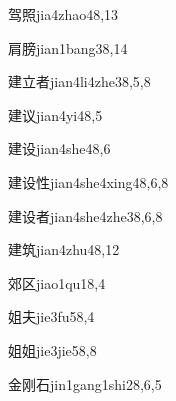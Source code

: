 \begin{verbete}{驾照}{jia4zhao4}{8,13}
\end{verbete}

\begin{verbete}{肩膀}{jian1bang3}{8,14}
\end{verbete}

\begin{verbete}{建立者}{jian4li4zhe3}{8,5,8}
\end{verbete}

\begin{verbete}{建议}{jian4yi4}{8,5}
\end{verbete}

\begin{verbete}{建设}{jian4she4}{8,6}
\end{verbete}

\begin{verbete}{建设性}{jian4she4xing4}{8,6,8}
\end{verbete}

\begin{verbete}{建设者}{jian4she4zhe3}{8,6,8}
\end{verbete}

\begin{verbete}{建筑}{jian4zhu4}{8,12}
\end{verbete}

\begin{verbete}{郊区}{jiao1qu1}{8,4}
\end{verbete}

\begin{verbete}{姐夫}{jie3fu5}{8,4}
\end{verbete}

\begin{verbete}{姐姐}{jie3jie5}{8,8}
\end{verbete}

\begin{verbete}{金刚石}{jin1gang1shi2}{8,6,5}
\end{verbete}

